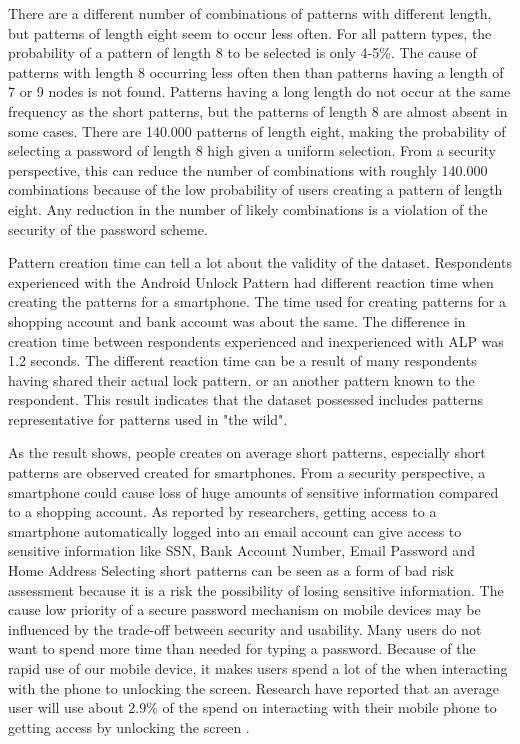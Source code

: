       There are a different number of combinations of patterns with different length, but patterns of length eight seem to occur less often. For all pattern types, the probability of a pattern of length 8 to be selected is only 4-5\%. The cause of patterns with length 8 occurring less often then than patterns having a length of 7 or 9 nodes is not found. Patterns having a long length do not occur at the same frequency as the short patterns, but the patterns of length 8 are almost absent in some cases. There are 140.000 patterns of length eight, making the probability of selecting a password of length 8 high given a uniform selection. From a security perspective, this can reduce the number of combinations with roughly 140.000 combinations because of the low probability of users creating a pattern of length eight. Any reduction in the number of likely combinations is a violation of the security of the password scheme.

      Pattern creation time can tell a lot about the validity of the dataset. Respondents experienced with the Android Unlock Pattern had different reaction time when creating the patterns for a smartphone. The time used for creating patterns for a shopping account and bank account was about the same. The difference in creation time between respondents experienced and inexperienced with ALP was 1.2 seconds. The different reaction time can be a result of many respondents having shared their actual lock pattern, or an another pattern known to the respondent. This result indicates that the dataset possessed includes patterns representative for patterns used in "the wild". 

      As the result shows, people creates on average short patterns, especially short patterns are observed created for smartphones. From a security perspective, a smartphone could cause loss of huge amounts of sensitive information compared to a shopping account. As reported by researchers, getting access to a smartphone automatically logged into an email account can give access to sensitive information like SSN, Bank Account Number, Email Password and Home Address \cite{Egelman}
      Selecting short patterns can be seen as a form of bad risk assessment because it is a risk the possibility of losing sensitive information. The cause low priority of a secure password mechanism on mobile devices may be influenced by the trade-off between security and usability. Many users do not want to spend more time than needed for typing a password. Because of the rapid use of our mobile device, it makes users spend a lot of the when interacting with the phone to unlocking the screen. Research have reported that an average user will use about 2.9\% of the spend on interacting with their mobile phone to getting access by unlocking the screen \cite{habits3}.

